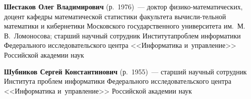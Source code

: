 \begin{multicols}{2}
 \vspace*{3pt}

 \noindent
\textbf{Шестаков Олег Владимирович} (р.\ 1976)~---
 доктор фи\-зи\-ко-ма\-те\-ма\-ти\-че\-ских, доцент кафедры математической
 статистики факультета вы\-чис\-ли-\linebreak тельной математики и кибернетики Московского
 государственного университета им.\ М.\,В.~Ломоносова; старший научный
 сотрудник Института\linebreak \mbox{проб\-лем} информатики Федерального исследовательского
 центра <<Информатика и~управ\-ле\-ние>> Российской академии наук

 \vspace*{3pt}

\noindent
\textbf{Шубников Сергей Константинович} (р.\ 1955)~---
старший научный сотрудник Института проблем информатики Федерального
исследовательского центра <<Информатика и~управ\-ле\-ние>> Российской\linebreak
 академии наук








 \label{end\stat}










\end{multicols}

\newpage
